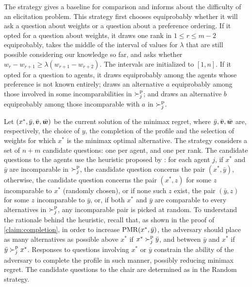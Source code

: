 \documentclass[sigconf, anonymous]{aamas}
\begin{document}
The  strategy gives a baseline for comparison and informs about the difficulty of an elicitation problem. 
This strategy first chooses equiprobably whether it will ask a question about weights or a question about a preference ordering. If it opted for a question about weights, it draws one rank in $1 ≤ r ≤ m-2$ equiprobably, takes the middle of the interval of values for $\lambda$ that are still possible considering our knowledge so far, and asks whether $w_r - w_{r+1} ≥ \lambda (w_{r+1} - w_{r+2})$. The intervals are initialized to $[1, n]$. If it opted for a question to agents, it draws equiprobably among the agents whose preference is not known entirely; draws an alternative $a$ equiprobably among those involved in some incomparabilities in $\succ^\text{p}_j$; and draws an alternative $b$ equiprobably among those incomparable with $a$ in $\succ^\text{p}_j$.

Let $(x^{*},\bar{y}, \bar{\bm{v}}, \bar{\bm{w}})$ be the current solution of the minimax regret, where $\bar{y}, \bar{\bm{v}}, \bar{\bm{w}}$ are, respectively, the choice of $y$, the completion of the profile and the selection of weights for which $x^{*}$ is the minimax optimal alternative. 
The  strategy considers a set of $n + m$ candidate questions: one per agent, and one per rank.
The candidate questions to the agents use the heuristic proposed by \citet{Lu2011}: for each agent $j$, if $x^*$ and $\bar{y}$ are incomparable in $\succ^\text{p}_j$, the candidate question concerns the pair $(x^*, \bar{y})$, otherwise, the candidate question concerns the pair $(x^*, z)$ for some $z$ incomparable to $x^*$ (randomly chosen), or if none such $z$ exist, the pair $(\bar{y}, z)$ for some $z$ incomparable to $\bar{y}$, or, if both $x^*$ and $\bar{y}$ are comparable to every alternatives in $\succ^\text{p}_j$, any incomparable pair is picked at random. 
To understand the rationale behind the heuristic, 
recall that, as shown in the proof of \cref{claim:completion}, in order to increase $\operatorname{PMR}(x^{*},\bar{y})$, the adversary should place as many alternatives as possible above $x^{*}$ if $x^* \succ^\text{p}_j \bar{y}$, and between $\bar{y}$ and $x^{*}$ if $\bar{y} \succ^\text{p}_j x^*$.  
Responses to questions involving $x^*$ or $\bar{y}$ constrain the ability of the adversary to complete the profile in such manner, possibly reducing minimax regret.
The candidate questions to the chair are determined as in the Random strategy.
\end{document}
